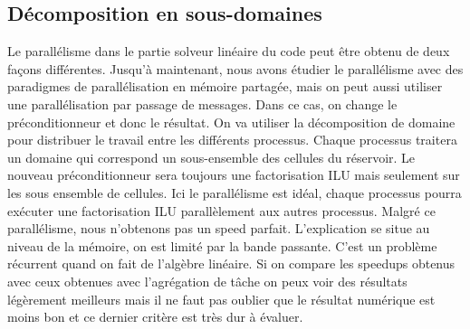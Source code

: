 \subsection{Décomposition en sous-domaines}
Le parallélisme dans le partie solveur linéaire du code peut être obtenu de deux façons différentes.
%
Jusqu'à maintenant, nous avons étudier le parallélisme avec des paradigmes de parallélisation en mémoire partagée, mais on peut aussi utiliser une parallélisation par passage de messages.
%
Dans ce cas, on change le préconditionneur et donc le résultat.
%
On va utiliser la décomposition de domaine pour distribuer le travail entre les différents processus.
%
Chaque processus traitera un domaine qui correspond un sous-ensemble des cellules du réservoir.
%
Le nouveau préconditionneur sera toujours une factorisation ILU mais seulement sur les sous ensemble de cellules.
%
Ici le parallélisme est idéal, chaque processus pourra exécuter une factorisation ILU parallèlement aux autres processus.
%
Malgré ce parallélisme, nous n'obtenons pas un speed parfait.
%
L'explication se situe au niveau de la mémoire, on est limité par la bande passante.
%
C'est un problème récurrent quand on fait de l'algèbre linéaire.
%
Si on compare les speedups obtenus avec ceux obtenues avec l'agrégation de tâche on peux voir des résultats légèrement meilleurs mais il ne faut pas oublier que le résultat numérique est moins bon et ce dernier critère est très dur à évaluer.
